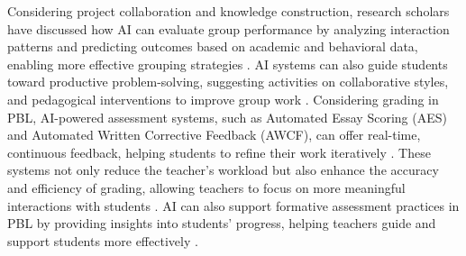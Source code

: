 Considering project collaboration and knowledge construction\cite{tanga2024exploration, dutta2024enhancing, asrifan2024integrating}, research scholars have discussed how AI can evaluate group performance by analyzing interaction patterns and predicting outcomes based on academic and behavioral data, enabling more effective grouping strategies \cite{cen2016quantitative, schneider2014toward}. AI systems can also guide students toward productive problem-solving, suggesting activities on collaborative styles, and pedagogical interventions to improve group work \cite{adamson2014towards, dyke2013enhancing, kumar2010architecture}. 
Considering grading in PBL, AI-powered assessment systems, such as Automated Essay Scoring (AES) and Automated Written Corrective Feedback (AWCF), can offer real-time, continuous feedback, helping students to refine their work iteratively \cite{rudolph2023chatgpt, cope2021artificial}. These systems not only reduce the teacher's workload but also enhance the accuracy and efficiency of grading, allowing teachers to focus on more meaningful interactions with students \cite{owan2023exploring}. AI can also support formative assessment practices in PBL by providing insights into students' progress, helping teachers guide and support students more effectively \cite{lan2024teachers}.

